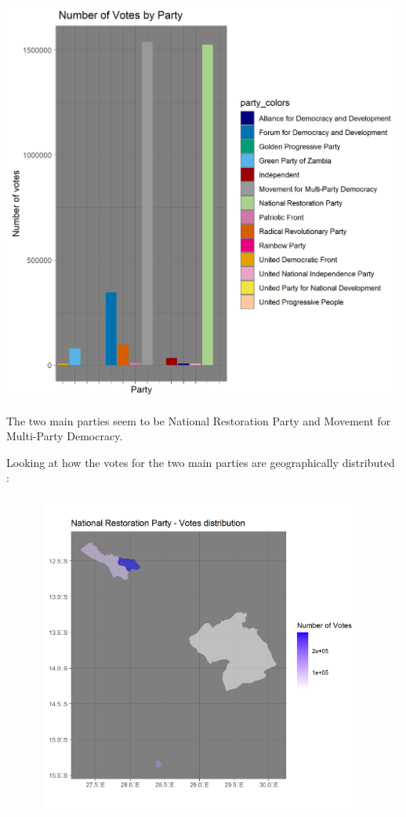 \documentclass[
]{article}
\begin{document}
\includegraphics[width=8.33333in,height=5.20833in]{votesharebar.png}

The two main parties seem to be National Restoration Party and Movement
for Multi-Party Democracy.

Looking at how the votes for the two main parties are geographically
distributed :

\includegraphics[width=5.20833in,height=4.16667in]{nrp.png}
\end{document}
